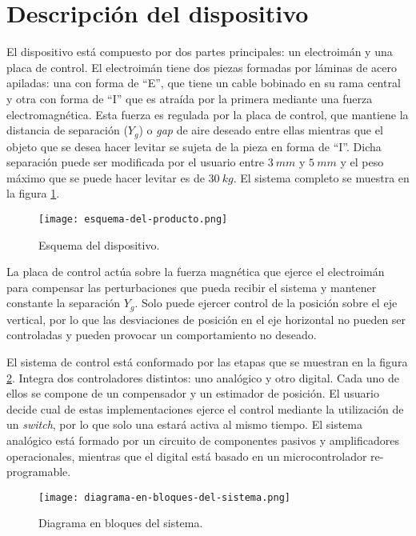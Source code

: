 \section{Descripción del dispositivo}

\noindent El dispositivo está compuesto por dos partes principales: un electroimán y una placa de control. El electroimán tiene dos piezas formadas por láminas de acero apiladas: una con forma de “E”, que tiene un cable bobinado en su rama central y otra con forma de “I” que es atraída por la primera mediante una fuerza electromagnética. Esta fuerza es regulada por la placa de control, que mantiene la distancia de separación ($Y_{g}$) o \textsl{gap} de aire deseado entre ellas mientras que el objeto que se desea hacer levitar se sujeta de la pieza en forma de “I”. Dicha separación puede ser modificada por el usuario entre $3\:mm$ y $5\:mm$ y el peso máximo que se puede hacer levitar es de $30\:kg$. El sistema completo se muestra en la figura \ref{fig:img_Esquema-del-producto}.

\begin{figure}[H]
	\centering
	\texttt{[image: esquema-del-producto.png]}
	\caption{Esquema del dispositivo.}
	\label{fig:img_Esquema-del-producto}
\end{figure}


La placa de control actúa sobre la fuerza magnética que ejerce el electroimán para compensar las perturbaciones que pueda recibir el sistema y mantener constante la separación $Y_{g}$. Solo puede ejercer control de la posición sobre el eje vertical, por lo que las desviaciones de posición en el eje horizontal no pueden ser controladas y pueden provocar un comportamiento no deseado.

El sistema de control está conformado por las etapas que se muestran en la figura \ref{fig:img_diagrama-en-bloques-del-sistema}. Integra dos controladores distintos: uno analógico y otro digital. Cada uno de ellos se compone de un compensador y un estimador de posición.  El usuario decide cual de estas implementaciones ejerce el control mediante la utilización de un \textsl{switch}, por lo que solo una estará activa al mismo tiempo. El sistema analógico está formado por un circuito de  componentes pasivos y amplificadores operacionales, mientras que el digital está basado en un microcontrolador re-programable.

\begin{figure}[H]
	\centering
	\texttt{[image: diagrama-en-bloques-del-sistema.png]}
	\caption{Diagrama en bloques del sistema.}
	\label{fig:img_diagrama-en-bloques-del-sistema}
\end{figure}


